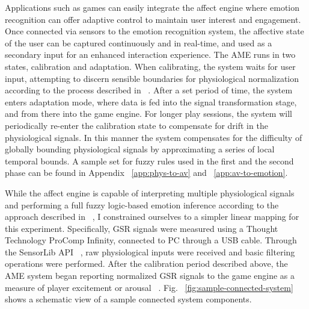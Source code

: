 
Applications such as games can easily integrate the affect engine where emotion recognition can offer adaptive control to maintain user interest and engagement. Once connected via sensors to the emotion recognition system, the affective state of the user can be captured continuously and in real-time, and used as a secondary input for an enhanced interaction experience. The AME runs in two states, calibration and adaptation. When calibrating, the system waits for user input, attempting to discern sensible boundaries for physiological normalization according to the process described in ~\cite{mandryk2007fuzzy}. After a set period of time, the system enters adaptation mode, where data is fed into the signal transformation stage, and from there into the game engine. For longer play sessions, the system will periodically re-enter the calibration state to compensate for drift in the physiological signals. In this manner the system compensates for the difficulty of globally bounding physiological signals by approximating a series of local temporal bounds. A sample set for fuzzy rules used in the first and the second phase can be found in Appendix ~\ref{app:phys-to-av} and ~\ref{app:av-to-emotion}.

While the affect engine is capable of interpreting multiple physiological signals and performing a full fuzzy logic-based emotion inference according to the approach described in ~\cite{mandryk2007fuzzy}, I constrained ourselves to a simpler linear mapping for this experiment. Specifically, GSR signals were measured using a Thought Technology ProComp Infinity, connected to PC through a USB cable. Through the SensorLib API ~\cite{nacke2011biofeedback}, raw physiological inputs were received and basic filtering operations were performed. After the calibration period described above, the AME system began reporting normalized GSR signals to the game engine as a measure of player excitement or arousal ~\cite{aggag2011affective, tijs2009creating}. Fig. ~\ref{fig:sample-connected-system} shows a schematic view of a sample connected system components.

